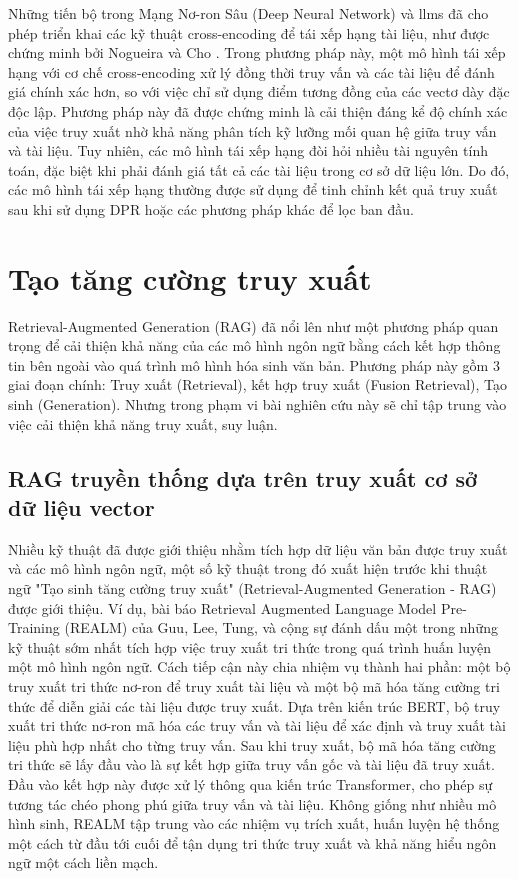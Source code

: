 Những tiến bộ trong Mạng Nơ-ron Sâu (Deep Neural Network) và \gls{llm}s đã cho phép triển khai các kỹ thuật cross-encoding để tái xếp hạng tài liệu, như được chứng minh bởi Nogueira và Cho \cite{nogueira2019passage}. Trong phương pháp này, một mô hình tái xếp hạng với cơ chế cross-encoding xử lý đồng thời truy vấn và các tài liệu để đánh giá chính xác hơn, so với việc chỉ sử dụng điểm tương đồng của các vectơ dày đặc độc lập. Phương pháp này đã được chứng minh là cải thiện đáng kể độ chính xác của việc truy xuất nhờ khả năng phân tích kỹ lưỡng mối quan hệ giữa truy vấn và tài liệu. Tuy nhiên, các mô hình tái xếp hạng đòi hỏi nhiều tài nguyên tính toán, đặc biệt khi phải đánh giá tất cả các tài liệu trong cơ sở dữ liệu lớn. Do đó, các mô hình tái xếp hạng thường được sử dụng để tinh chỉnh kết quả truy xuất sau khi sử dụng DPR hoặc các phương pháp khác để lọc ban đầu.

\section{Tạo tăng cường truy xuất}
\label{section:retrieval_augmented_generation}
Retrieval-Augmented Generation (RAG) đã nổi lên như một phương pháp quan trọng để cải thiện khả năng của các mô hình ngôn ngữ bằng cách kết hợp thông tin bên ngoài vào quá trình mô hình hóa sinh văn bản. Phương pháp này gồm 3 giai đoạn chính: Truy xuất (Retrieval), kết hợp truy xuất (Fusion Retrieval), Tạo sinh (Generation). Nhưng trong phạm vi bài nghiên cứu này sẽ chỉ tập trung vào việc cải thiện khả năng truy xuất, suy luận.

\subsection{RAG truyền thống dựa trên truy xuất cơ sở dữ liệu vector}
\label{subsection:traditional_rag}

Nhiều kỹ thuật đã được giới thiệu nhằm tích hợp dữ liệu văn bản được truy xuất và các mô hình ngôn ngữ, một số kỹ thuật trong đó xuất hiện trước khi thuật ngữ "Tạo sinh tăng cường truy xuất" (Retrieval-Augmented Generation - RAG) được giới thiệu. Ví dụ, bài báo Retrieval Augmented Language Model Pre-Training (REALM) của Guu, Lee, Tung, và cộng sự \cite{guu2020realm} đánh dấu một trong những kỹ thuật sớm nhất tích hợp việc truy xuất tri thức trong quá trình huấn luyện một mô hình ngôn ngữ. Cách tiếp cận này chia nhiệm vụ thành hai phần: một bộ truy xuất tri thức nơ-ron để truy xuất tài liệu và một bộ mã hóa tăng cường tri thức để diễn giải các tài liệu được truy xuất. Dựa trên kiến trúc BERT, bộ truy xuất tri thức nơ-ron mã hóa các truy vấn và tài liệu để xác định và truy xuất tài liệu phù hợp nhất cho từng truy vấn. Sau khi truy xuất, bộ mã hóa tăng cường tri thức sẽ lấy đầu vào là sự kết hợp giữa truy vấn gốc và tài liệu đã truy xuất. Đầu vào kết hợp này được xử lý thông qua kiến trúc Transformer, cho phép sự tương tác chéo phong phú giữa truy vấn và tài liệu. Không giống như nhiều mô hình sinh, REALM tập trung vào các nhiệm vụ trích xuất, huấn luyện hệ thống một cách từ đầu tới cuối để tận dụng tri thức truy xuất và khả năng hiểu ngôn ngữ một cách liền mạch.

